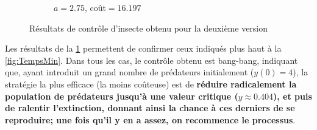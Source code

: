 \documentclass[
	french,
	11pt, %
]{fphw}
\begin{document}
\begin{figure}[H]
\begin{subfigure}[b]{0.32\textwidth}
        \caption{$a = 2.75$, coût$=16.197$}
    \end{subfigure}
       \caption{Résultats de contrôle d'insecte obtenu pour la deuxième version}
       \label{fig:CoutMin}
\end{figure}

Les résultats de la \cref{fig:CoutMin} permettent de confirmer ceux indiqués plus haut à la \cref{fig:TempsMin}. Dans tous les cas, le contrôle obtenu est bang-bang, indiquant que, ayant introduit un grand nombre de prédateurs initialement ($y(0)=4$), la stratégie la plus efficace (la moins coûteuse) est de \textbf{réduire radicalement la population de prédateurs jusqu'à une valeur critique ($y \approx 0.404$), et puis de ralentir l'extinction, donnant ainsi la chance à ces derniers de se reproduire; une fois qu'il y en a assez, on recommence le processus}. 

\end{document}
